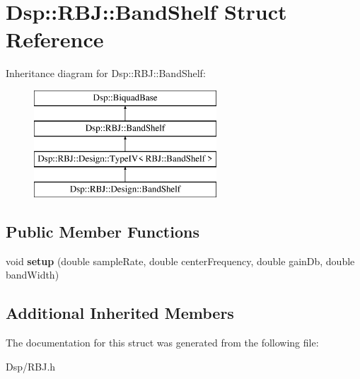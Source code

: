\hypertarget{structDsp_1_1RBJ_1_1BandShelf}{\section{Dsp\-:\-:R\-B\-J\-:\-:Band\-Shelf Struct Reference}
\label{structDsp_1_1RBJ_1_1BandShelf}
}
Inheritance diagram for Dsp\-:\-:R\-B\-J\-:\-:Band\-Shelf\-:\begin{figure}[H]
\begin{center}
\leavevmode
\includegraphics[height=4.000000cm]{structDsp_1_1RBJ_1_1BandShelf}
\end{center}
\end{figure}
\subsection*{Public Member Functions}
\begin{DoxyCompactItemize}
\item 
\hypertarget{structDsp_1_1RBJ_1_1BandShelf_a3c5436e3722f80b8c4b5ca9bf29a2538}{void {\bfseries setup} (double sample\-Rate, double center\-Frequency, double gain\-Db, double band\-Width)}\label{structDsp_1_1RBJ_1_1BandShelf_a3c5436e3722f80b8c4b5ca9bf29a2538}

\end{DoxyCompactItemize}
\subsection*{Additional Inherited Members}


The documentation for this struct was generated from the following file\-:\begin{DoxyCompactItemize}
\item 
Dsp/R\-B\-J.\-h\end{DoxyCompactItemize}
